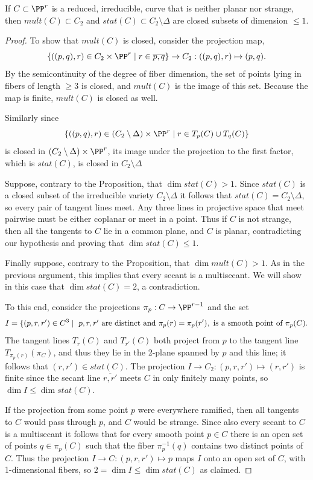 \begin{proposition}\label{mult and stat}
 If $C\subset \PP^r$ is a reduced, irreducible, curve that is neither planar nor strange, then $mult(C)\subset C_2$
 and $stat(C)\subset C_2\setminus \Delta$ are closed subsets of dimension $\leq 1$.
\end{proposition}

\begin{proof}
To show that $mult(C)$ is closed, consider the projection map, 
$$
\{((p,q), r) \in C_2\times \PP^r \mid r \in \overline{p,q}\} \to C_2 : ((p,q),r)\mapsto (p,q).
$$
By the semicontinuity of the degree of fiber dimension, the set of points lying in fibers
of length $\geq 3$ is closed, and $mult(C)$ is the image of this set. Because the map is finite, 
$mult(C)$  is closed as well.

Similarly since 
$$
\{((p,q), r) \in (C_2\setminus \Delta)\times \PP^r \mid r \in T_p(C)\cup T_q(C) \}
$$
is closed in $(C_2\setminus \Delta)\times \PP^r$, its image under the projection to the first factor,
which is $stat(C)$, is closed in $C_2\setminus \Delta$

Suppose, contrary to the Proposition, that $\dim stat(C) >1$. Since $stat(C)$ is a closed subset of the irreducible variety $C_2\setminus \Delta$ it
follows that $stat(C) = C_2\setminus \Delta$, so every pair of tangent lines meet. Any three
lines in projective space that meet pairwise must be either coplanar or meet in a point. Thus if $C$ is not strange,
then all the tangents to $C$ lie in a common plane, and $C$ is planar, contradicting our hypothesis
and proving that $\dim stat(C)\leq 1$.

Finally suppose, contrary to the Proposition,  that $\dim mult(C)>1$. As in the previous argument, this
implies that every secant is a multisecant.  We will show in this case that $\dim stat(C) =2$, a contradiction. 

To this end, consider the projections $\pi_{p}: C \to \PP^{r-1}$ and the set  
$$
I = \{(p,r,r') \in C^3 \mid \hbox{ $p,r,r'$ are distinct and } \pi_{p}(r) = \pi_{p}(r'), \hbox{ is a smooth point of $\pi_p(C)$}.
$$
The tangent lines $T_r(C)$ and $T_{r'}(C)$ both project from $p$ to the tangent line $T_{\pi_p(r)}(\pi_C)$,
and thus they lie in the 2-plane spanned by $p$ and this line; it follows that $(r,r') \in stat(C)$.
The projection $I \to C_2: (p,r,r') \mapsto (r,r')$ is finite since the secant line $\overline{r,r'}$ meets $C$ in only finitely many points, 
so $\dim I \leq \dim stat(C)$.

 If the projection from some point $p$ were everywhere ramified,
then all tangents to $C$ would pass through $p$, and $C$ would be strange.
Since also every secant to $C$ is a multisecant it follows that  for every smooth point $p\in C$ there is an open set of points $q\in \pi_p(C)$ such that
the fiber $\pi_p^{-1}(q)$ contains two distinct points of $C$. Thus the projection $I \to C: (p,r,r') \mapsto p$ maps
$I$ onto an open set of $C$, with 1-dimensional fibers, so $2 = \dim I\leq \dim stat(C)$ as claimed. \end{proof}


